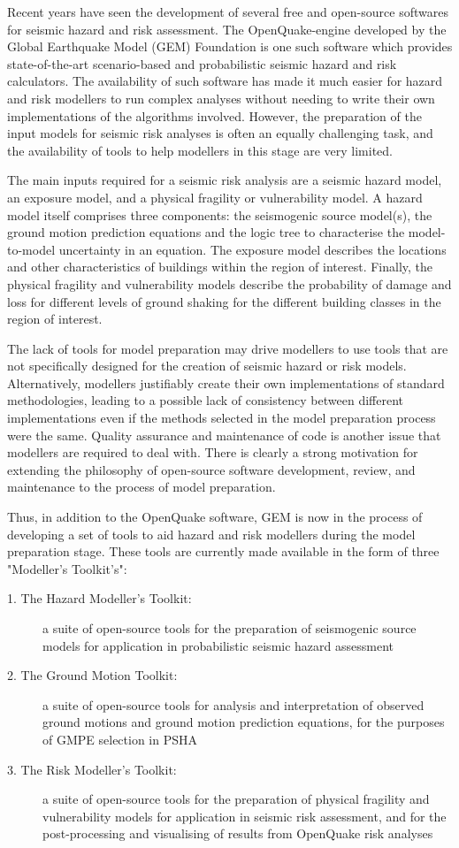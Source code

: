 Recent years have seen the development of several free and open-source softwares for seismic hazard and risk assessment. The OpenQuake-engine developed by the Global Earthquake Model (GEM) Foundation \citep{PaganiEtAl2014a} is one such software which provides state-of-the-art scenario-based and probabilistic seismic hazard and risk calculators. The availability of such software has made it much easier for hazard and risk modellers to run complex analyses without needing to write their own implementations of the algorithms involved. However, the preparation of the input models for seismic risk analyses is often an equally challenging task, and the availability of tools to help modellers in this stage are very limited.

The main inputs required for a seismic risk analysis are a seismic hazard model, an exposure model, and a physical fragility or vulnerability model. A hazard model itself comprises three components: the seismogenic source model(s), the ground motion prediction equations and the logic tree to characterise the model-to-model uncertainty in an equation. The exposure model describes the locations and other characteristics of buildings within the region of interest. Finally, the physical fragility and vulnerability models describe the probability of damage and loss for different levels of ground shaking for the different building classes in the region of interest.

The lack of tools for model preparation may drive modellers to use tools that are not specifically designed for the creation of seismic hazard or risk models. Alternatively, modellers justifiably create their own implementations of standard methodologies, leading to a possible lack of consistency between different implementations even if the methods selected in the model preparation process were the same. Quality assurance and maintenance of code is another issue that modellers are required to deal with. There is clearly a strong motivation for extending the philosophy of open-source software development, review, and maintenance to the process of model preparation.

Thus, in addition to the OpenQuake software, GEM is now in the process of developing a set of tools to aid hazard and risk modellers during the model preparation stage. These tools are currently made available in the form of three "Modeller’s Toolkit’s":
\begin{description}
\item[1. The Hazard Modeller’s Toolkit:] a suite of open-source tools for the preparation of seismogenic source models for application in probabilistic seismic hazard assessment \citep{hmtk_guide}
\item[2. The Ground Motion Toolkit:] a suite of open-source tools for analysis and interpretation of observed ground motions and ground motion prediction equations, for the purposes of GMPE selection in PSHA
\item[3. The Risk Modeller's Toolkit:] a suite of open-source tools for the preparation of physical fragility and vulnerability models for application in seismic risk assessment, and for the post-processing and visualising of results from OpenQuake risk analyses
\end{description}

